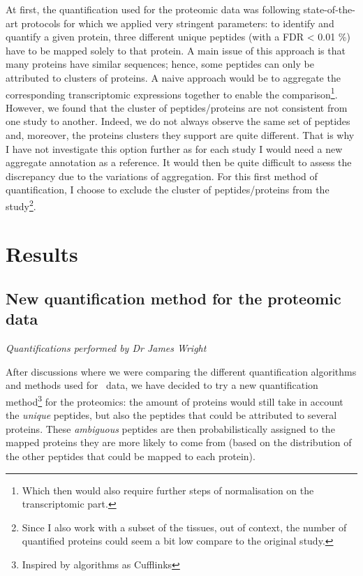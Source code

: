 At first, the quantification used for the proteomic data was following
state-of-the-art protocols for which we applied very stringent parameters:
to identify and quantify a given protein, three different unique peptides
(with a \gls{FDR} < 0.01 \%) have to be mapped solely to that protein. A main
issue of this approach is that many proteins have similar sequences; hence, some
peptides can only be attributed to clusters of proteins. A naive approach would
be to aggregate the corresponding transcriptomic expressions together to enable
the comparison\footnote{Which then would also require further steps of
normalisation on the transcriptomic part.}. However, we found that the cluster
of peptides/proteins are not consistent from one study to another. Indeed, we do
not always observe the same set of peptides and, moreover, the proteins clusters
they support are quite different. That is why I have not investigate this option
further as for each study I would need a new aggregate annotation as a reference.
It would then be quite difficult to assess the discrepancy due to the
variations of aggregation. For this first method of quantification, I choose to
exclude the cluster of peptides/proteins from the study\footnote{Since I also work
with a subset of the tissues, out of context, the number of quantified proteins
could seem a bit low compare to the original study.}.


\section{Results}
\label{sec:IntegrationResults}

\subsection{New quantification method for the proteomic data}
\label{sec:IntegrationNewMethQuant}

\textit{Quantifications performed by Dr James Wright}

After discussions where we were comparing the different quantification algorithms
and methods used for \Rnaseq\ data, we have decided to try a new quantification
method\footnote{Inspired by algorithms as Cufflinks} for the proteomics:
the amount of proteins would still take in account the \emph{unique} peptides,
but also the peptides that could be attributed to several proteins.
These \emph{ambiguous} peptides are then probabilistically assigned to the
mapped proteins they are more likely to come from (based on the distribution of
the other peptides that could be mapped to each protein).

